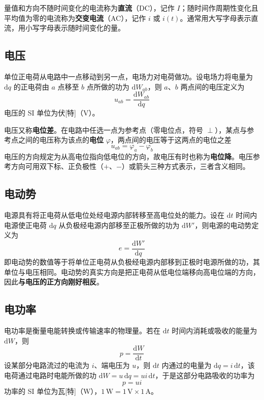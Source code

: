 量值和方向不随时间变化的电流称为\textbf{直流}（DC），记作 $I$；随时间作周期性变化且平均值为零的电流称为\textbf{交变电流}（AC），记作 $i$ 或 $i(t)$。通常用大写字母表示直流，用小写字母表示随时间变化的量。

\subsection{电压}
单位正电荷从电路中一点移动到另一点，电场力对电荷做功。设电场力将电量为 $\mathrm{d}q$ 的正电荷由 $a$ 点移至 $b$ 点所做的功为 $\mathrm{d}W_{ab}$，则 $a$、$b$ 两点间的电压定义为
\begin{equation}
u_{ab}=\frac{\mathrm{d}W_{ab}}{\mathrm{d}q}
\end{equation}
电压的 SI 单位为伏[特]（$\mathrm{V}$）。

电压又称\textbf{电位差}。在电路中任选一点为参考点（零电位点，符号 $\perp$），某点与参考点之间的电压称为该点的\textbf{电位} $\varphi$，两点间的电压等于这两点的电位之差
\begin{equation}
u_{ab}=\varphi_a-\varphi_b
\end{equation}
电压的方向规定为从高电位指向低电位的方向，故电压有时也称为\textbf{电位降}。电压参考方向可用双下标、正负极性（$+$、$-$）或箭头三种方式表示，三者含义相同。


\subsection{电动势}
电源具有将正电荷从低电位处经电源内部转移至高电位处的能力。设在 $\mathrm{d}t$ 时间内电源使正电荷 $\mathrm{d}q$ 从负极经电源内部移至正极所做的功为 $\mathrm{d}W'$，则电源的电动势定义为
\begin{equation}
e=\frac{\mathrm{d}W'}{\mathrm{d}q}
\end{equation}
即电动势的数值等于将单位正电荷从负极经电源内部移到正极时电源所做的功，其单位与电压相同。电动势的真实方向是把正电荷从低电位端移向高电位端的方向，因此\textbf{与电压的正方向刚好相反}。

\subsection{电功率}
电功率是衡量电能转换或传输速率的物理量。若在 $\mathrm{d}t$ 时间内消耗或吸收的能量为 $\mathrm{d}W$，则
\begin{equation}
p=\frac{\mathrm{d}W}{\mathrm{d}t}
\end{equation}
设某部分电路流过的电流为 $i$、端电压为 $u$，则 $\mathrm{d}t$ 内通过的电量为 $\mathrm{d}q=i\,\mathrm{d}t$，该电荷通过电路时电能所做的功 $\mathrm{d}W=u\,\mathrm{d}q=ui\,\mathrm{d}t$，于是这部分电路吸收的功率为
\begin{equation}
p=ui
\end{equation}
功率的 SI 单位为瓦[特]（$\mathrm{W}$），$1\,\mathrm{W}=1\,\mathrm{V}\times1\,\mathrm{A}$。

